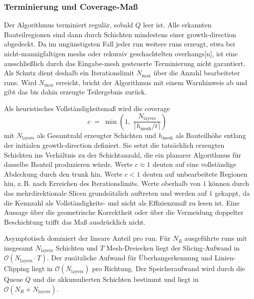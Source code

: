             \subsubsection{Terminierung und Coverage-Maß}\label{subsubsec:concept-base-termination}
                Der Algorithmus terminiert regulär, sobald $Q$ leer ist.
                Alle erkannten Bauteilregionen sind dann durch Schichten mindestens einer \gls{growth-direction} abgedeckt.
                Da im ungünstigsten Fall jeder \gls{run} weitere \glspl{run} erzeugt, etwa bei nicht-mannigfaltigen \glspl{mesh} oder rekursiv geschachtelten \glspl{overhang}[n], ist eine ausschließlich durch das Eingabe-\gls{mesh} gesteuerte Terminierung nicht garantiert.
                Als Schutz dient deshalb ein Iterationslimit $N_\text{max}$ über die Anzahl bearbeiteter \glspl{run}.
                Wird $N_\text{max}$ erreicht, bricht der Algorithmus mit einem Warnhinweis ab und gibt das bis dahin erzeugte Teilergebnis zurück.

                Als heuristisches Vollständigkeitsmaß wird die \gls{coverage} 
                \begin{equation}
                    c \;=\; \min\!\left(1,\;
                        \frac{N_\text{layers}}{\lceil h_\text{mesh} / t \rceil}
                    \right)
                    \label{eq:concept-base-coverage}
                \end{equation}
                mit $N_\text{layers}$ als Gesamtzahl erzeugter Schichten und $h_\text{mesh}$ als Bauteilhöhe entlang der initialen \gls{growth-direction} definiert.
                Sie setzt die tatsächlich erzeugten Schichten ins Verhältnis zu der Schichtanzahl, die ein planarer Algorithmus für dasselbe Bauteil produzieren würde.
                Werte $c \approx 1$ deuten auf eine vollständige Abdeckung durch den \gls{trunk} hin.
                Werte $c < 1$ deuten auf unbearbeitete Regionen hin, z.\,B. nach Erreichen des Iterationslimits.
                Werte oberhalb von $1$ können durch das mehrdirektionale Slicen grundsätzlich auftreten und werden auf $1$ gekappt, da die Kennzahl als Vollständigkeits- und nicht als Effizienzmaß zu lesen ist.
                Eine Aussage über die geometrische Korrektheit oder über die Vermeidung doppelter Beschichtung trifft das Maß ausdrücklich nicht.

                Asymptotisch dominiert der lineare Anteil pro \gls{run}.
                Für $N_R$ ausgeführte \glspl{run} mit insgesamt $N_\text{layers}$ Schichten und $T$ Mesh-Dreiecken liegt der Slicing-Aufwand in $\mathcal{O}(N_\text{layers} \cdot T)$.
                Der zusätzliche Aufwand für Überhangerkennung und Linien-Clipping liegt in $\mathcal{O}(N_\text{layers})$ pro Richtung.
                Der Speicheraufwand wird durch die Queue $Q$ und die akkumulierten Schichten bestimmt und liegt in $\mathcal{O}(N_R + N_\text{layers})$.

